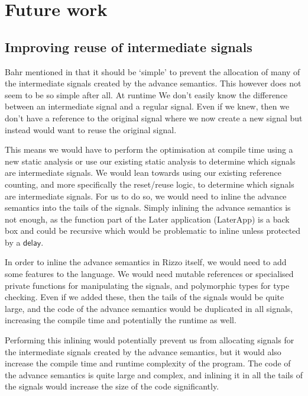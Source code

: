 \section{Future work}


\subsection{Improving reuse of intermediate signals}

Bahr mentioned in \cite{rizzo_modal_2025} that it should be `simple' to prevent the allocation of many of the intermediate signals created by the advance semantics. This however does not seem to be so simple after all. At runtime We don't easily know the difference between an intermediate signal and a regular signal. Even if we knew, then we don't have a reference to the original signal where we now create a new signal but instead would want to reuse the original signal.

This means we would have to perform the optimisation at compile time using a new static analysis or use our existing static analysis to determine which signals are intermediate signals. We would lean towards using our existing reference counting, and more specifically the reset/reuse logic, to determine which signals are intermediate signals. For us to do so, we would need to inline the advance semantics into the tails of the signals. Simply inlining the advance semantics is not enough, as the function part of the Later application (LaterApp) is a back box and could be recursive which would be problematic to inline unless protected by a $\mathsf{delay}$.

In order to inline the advance semantics in Rizzo itself, we would need to add some features to the language. We would need mutable references or specialised private functions for manipulating the signals, and polymorphic types for type checking. 
Even if we added these, then the tails of the signals would be quite large, and the code of the advance semantics would be duplicated in all signals, increasing the compile time and potentially the runtime as well.

Performing this inlining would potentially prevent us from allocating signals for the intermediate signals created by the advance semantics, but it would also increase the compile time and runtime complexity of the program. The code of the advance semantics is quite large and complex, and inlining it in all the tails of the signals would increase the size of the code significantly. 

